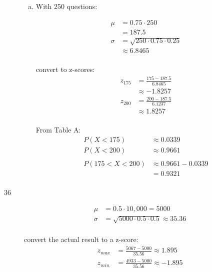 \documentclass[letterpaper, landscape]{exam}
\begin{document}
\begin{description}
\begin{enumerate}[(a)]
          \item
            With 250 questions:

            \begin{align*}
              \mu    & = 0.75 \cdot 250 \\
                     & = 187.5 \\
              \sigma & = \sqrt{250 \cdot 0.75 \cdot 0.25} \\
                     & \approx 6.8465 \\
            \end{align*}

            convert to z-scores:
            \begin{align*}
              z_{175} & = \frac{175 - 187.5}{6.8465} \\
                      & \approx -1.8257 \\
              z_{200} & = \frac{200 - 187.5}{6.1237} \\
                      & \approx 1.8257 \\
            \end{align*}

            From Table A:
            \begin{align*}
              P(X < 175) & \approx 0.0339 \\
              P(X < 200) & \approx 0.9661 \\
              \\
              P(175 < X < 200) & \approx 0.9661 - 0.0339 \\
                               & = \boxed{ 0.9321 } \\
            \end{align*}
        
        \end{enumerate}

      \item[36]
        \begin{align*}
          \mu    & = 0.5 \cdot 10,000 = 5000 \\
          \sigma & = \sqrt{5000 \cdot 0.5 \cdot 0.5} \approx 35.36 \\
        \end{align*}

        convert the actual result to a z-score:
        \begin{align*}
          z_{max} &= \frac{5067 - 5000}{35.56} \approx 1.895 \\
          z_{min} &= \frac{4933 - 5000}{35.56} \approx -1.895 \\
        \end{align*}


\end{description}
\end{document}
